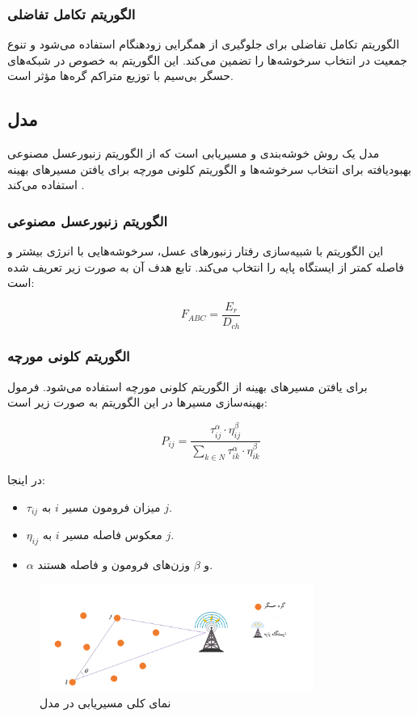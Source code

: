 \documentclass[12pt, onecolumn, a4paper]{article}
\begin{document}
\subsubsection{الگوریتم تکامل تفاضلی}
الگوریتم تکامل تفاضلی برای جلوگیری از همگرایی زودهنگام استفاده می‌شود و تنوع جمعیت در انتخاب سرخوشه‌ها را تضمین می‌کند. این الگوریتم به خصوص در شبکه‌های حسگر بی‌سیم با توزیع متراکم گره‌ها مؤثر است.

\subsection{مدل }
مدل  یک روش خوشه‌بندی و مسیریابی است که از الگوریتم زنبورعسل مصنوعی بهبودیافته برای انتخاب سرخوشه‌ها و الگوریتم کلونی مورچه برای یافتن مسیرهای بهینه استفاده می‌کند \cite{ref6, ref7}.

\subsubsection{الگوریتم زنبورعسل مصنوعی}
این الگوریتم با شبیه‌سازی رفتار زنبورهای عسل، سرخوشه‌هایی با انرژی بیشتر و فاصله کمتر از ایستگاه پایه را انتخاب می‌کند. تابع هدف آن به صورت زیر تعریف شده است:

\begin{equation}
	F_{ABC} = \frac{E_r}{D_{ch}}
\end{equation}

\subsubsection{الگوریتم کلونی مورچه}
برای یافتن مسیرهای بهینه از الگوریتم کلونی مورچه استفاده می‌شود. فرمول بهینه‌سازی مسیرها در این الگوریتم به صورت زیر است:

\begin{equation}
	P_{ij} = \frac{\tau_{ij}^\alpha \cdot \eta_{ij}^\beta}{\sum_{k \in N} \tau_{ik}^\alpha \cdot \eta_{ik}^\beta}
\end{equation}

در اینجا:
\begin{itemize}
	\item $\tau_{ij}$ میزان فرومون مسیر $i$ به $j$.
	\item $\eta_{ij}$ معکوس فاصله مسیر $i$ به $j$.
	\item $\alpha$ و $\beta$ وزن‌های فرومون و فاصله هستند.
\end{itemize}

\begin{figure}[h]
	\centering
	\includegraphics[width=0.8\textwidth]{routing-abc-aco.png}
	\caption{نمای کلی مسیریابی در مدل }
	\label{fig:routing_abc_aco}
\end{figure}
\end{document}
